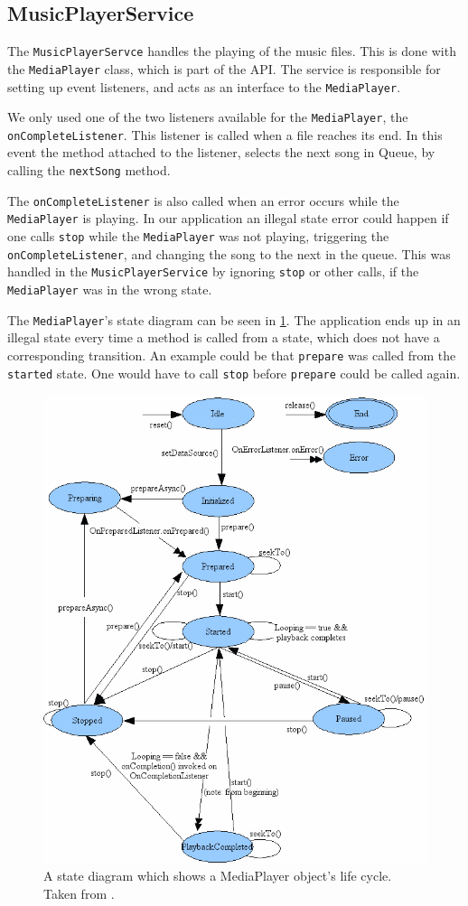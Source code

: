 \subsection{MusicPlayerService} 
The \texttt{MusicPlayerServce} handles the playing of the music files. This is done with the \texttt{MediaPlayer} class, which is part of the \citet{android:MediaPlayer} API. The service is responsible for setting up event listeners, and acts as an interface to the \texttt{MediaPlayer}.  

We only used one of the two listeners available for the \texttt{MediaPlayer}, the \texttt{onCompleteListener}. This listener is called when a file reaches its end. In this event the method attached to the listener, selects the next song in Queue, by calling the \texttt{nextSong} method. 

The \texttt{onCompleteListener} is also called when an error occurs while the \texttt{MediaPlayer} is playing. In our application an illegal state error could happen if one calls \texttt{stop} while the \texttt{MediaPlayer} was not playing, triggering the \texttt{onCompleteListener}, and changing the song to the next in the queue. This was handled in the \texttt{MusicPlayerService} by ignoring \texttt{stop} or other calls, if the \texttt{MediaPlayer} was in the wrong state. 

The \texttt{MediaPlayer}'s state diagram can be seen in \cref{fig:medaiPlayerState}. The application ends up in an illegal state every time a method is called from a state, which does not have a corresponding transition. An example could be that \texttt{prepare} was called from the \texttt{started} state. One would have to call \texttt{stop} before \texttt{prepare} could be called again.

\begin{figure}[h!]
  \centering
    \includegraphics[width=\textwidth]{Images/mediaplayerStateDiagram.png}
  \caption{A state diagram which shows a MediaPlayer object's life cycle. Taken from \citet{android:MediaPlayer}.}
  \label{fig:medaiPlayerState}
\end{figure}
